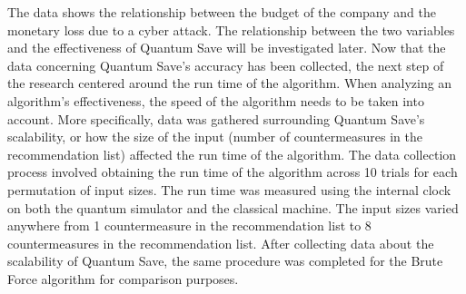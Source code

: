 The data shows the relationship between the budget of the company and the monetary loss due to a cyber attack. The relationship between the two variables and the effectiveness of Quantum Save will be investigated later. Now that the data concerning Quantum Save's accuracy has been collected, the next step of the research centered around the run time of the algorithm. When analyzing an algorithm's effectiveness, the speed of the algorithm needs to be taken into account. More specifically, data was gathered surrounding Quantum Save's scalability, or how the size of the input (number of countermeasures in the recommendation list) affected the run time of the algorithm. The data collection process involved obtaining the run time of the algorithm across 10 trials for each permutation of input sizes. The run time was measured using the internal clock on both the quantum simulator and the classical machine. The input sizes varied anywhere from 1 countermeasure in the recommendation list to 8 countermeasures in the recommendation list. After collecting data about the scalability of Quantum Save, the same procedure was completed for the Brute Force algorithm for comparison purposes. 
